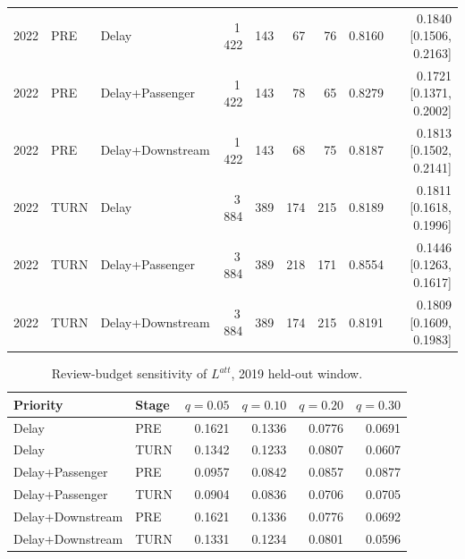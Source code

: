 \documentclass[10pt,a4paper]{article}
\numberwithin{equation}{section}
\begin{document}
\begin{table}[htbp]
\begin{tabular}{lllrrrrrr}
2022 & PRE & Delay & 1\,422 & 143 & 67 & 76 & 0.8160 & 0.1840 [0.1506, 0.2163] \\
2022 & PRE & Delay+Passenger & 1\,422 & 143 & 78 & 65 & 0.8279 & 0.1721 [0.1371, 0.2002] \\
2022 & PRE & Delay+Downstream & 1\,422 & 143 & 68 & 75 & 0.8187 & 0.1813 [0.1502, 0.2141] \\
2022 & TURN & Delay & 3\,884 & 389 & 174 & 215 & 0.8189 & 0.1811 [0.1618, 0.1996] \\
2022 & TURN & Delay+Passenger & 3\,884 & 389 & 218 & 171 & 0.8554 & 0.1446 [0.1263, 0.1617] \\
2022 & TURN & Delay+Downstream & 3\,884 & 389 & 174 & 215 & 0.8191 & 0.1809 [0.1609, 0.1983] \\
\bottomrule
\end{tabular}
\end{table}

\begin{table}[htbp]\centering\footnotesize
\caption{Review-budget sensitivity of $L^{att}$, 2019 held-out window.}\label{tab:sup_e1_q}
\begin{tabular}{llrrrr}\toprule
Priority & Stage & $q=0.05$ & $q=0.10$ & $q=0.20$ & $q=0.30$ \\ \midrule
Delay & PRE & 0.1621 & 0.1336 & 0.0776 & 0.0691 \\
Delay & TURN & 0.1342 & 0.1233 & 0.0807 & 0.0607 \\
Delay+Passenger & PRE & 0.0957 & 0.0842 & 0.0857 & 0.0877 \\
Delay+Passenger & TURN & 0.0904 & 0.0836 & 0.0706 & 0.0705 \\
Delay+Downstream & PRE & 0.1621 & 0.1336 & 0.0776 & 0.0692 \\
Delay+Downstream & TURN & 0.1331 & 0.1234 & 0.0801 & 0.0596 \\
\bottomrule
\end{tabular}
\end{table}
\end{document}
